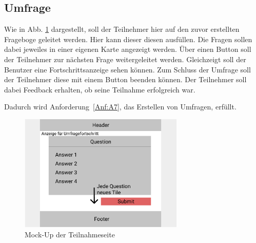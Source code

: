 \subsection{Umfrage}
\label{ssec:konzept:client:umfrage}
Wie in Abb. \ref{fig:MockUmfrageTeilnehmer} dargestellt, soll der Teilnehmer hier auf den zuvor erstellten Frageboge geleitet werden. 
Hier kann dieser diesen ausfüllen.
Die Fragen sollen dabei jeweiles in einer eigenen Karte angezeigt werden.
Über einen Button soll der Teilnehmer zur nächsten Frage weitergeleitet werden. 
Gleichzeigt soll der Benutzer eine Fortschrittsanzeige sehen können.
Zum Schluss der Umfrage soll der Teilnehmer diese mit einem Button beenden können.
Der Teilnehmer soll dabei Feedback erhalten, ob seine Teilnahme erfolgreich war. 

Dadurch wird Anforderung~\ref{Anf:A7}, das Erstellen von Umfragen, erfüllt.

\begin{figure}[H]
	\centering
	\includegraphics[width=0.7\textwidth]{img/konzeption/client/umfrage_teilnehmer}
	\captionsetup{justification=centering, format=plain}
	\caption[Mock-Up der Teilnahmeseite]{Mock-Up der Teilnahmeseite\\\figma}
	\label{fig:MockUmfrageTeilnehmer}
\end{figure}